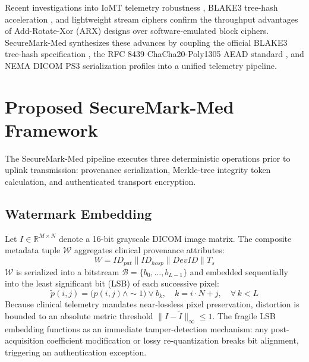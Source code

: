 \documentclass[runningheads]{llncs}
\begin{document}
Recent investigations into IoMT telemetry robustness \cite{singh2025ensuring}, BLAKE3 tree-hash acceleration \cite{jasim2025optimizing}, and lightweight stream ciphers \cite{buhler2022benchmarking} confirm the throughput advantages of Add-Rotate-Xor (ARX) designs over software-emulated block ciphers. SecureMark-Med synthesizes these advances by coupling the official BLAKE3 tree-hash specification \cite{oconnor2020blake3}, the RFC 8439 ChaCha20-Poly1305 AEAD standard \cite{nir2018chacha20}, and NEMA DICOM PS3 serialization profiles \cite{nema2024dicom} into a unified telemetry pipeline.

\section{Proposed SecureMark-Med Framework}

The SecureMark-Med pipeline executes three deterministic operations prior to uplink transmission: provenance serialization, Merkle-tree integrity token calculation, and authenticated transport encryption.

\subsection{Watermark Embedding}
Let $I \in \mathbb{R}^{M \times N}$ denote a 16-bit grayscale DICOM image matrix. The composite metadata tuple $\mathcal{W}$ aggregates clinical provenance attributes:
\begin{equation}
  W = ID_{pat} \parallel ID_{hosp} \parallel DevID \parallel T_s
\end{equation}
$\mathcal{W}$ is serialized into a bitstream $\mathcal{B} = \{b_0, \dots, b_{L-1}\}$ and embedded sequentially into the least significant bit (LSB) of each successive pixel:
\begin{equation}
  \tilde{p}(i,j) = \bigl(p(i,j) \land {\sim}1\bigr) \lor b_k, \quad k = i \cdot N + j, \quad \forall\,k < L
\end{equation}
Because clinical telemetry mandates near-lossless pixel preservation, distortion is bounded to an absolute metric threshold $\|I - \tilde{I}\|_\infty \le 1$. The fragile LSB embedding functions as an immediate tamper-detection mechanism: any post-acquisition coefficient modification or lossy re-quantization breaks bit alignment, triggering an authentication exception.
\end{document}
